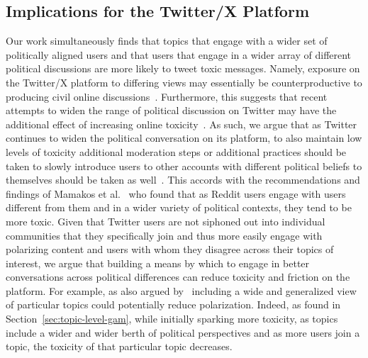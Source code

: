 \subsection{Implications for the Twitter/X Platform} Our work simultaneously finds that topics that engage with a wider set of politically aligned users and that users that engage in a wider array of different political discussions are more likely to tweet toxic messages. Namely, exposure on the Twitter/X platform to differing views may essentially be counterproductive to producing civil online discussions~\cite{bail2018exposure}.  Furthermore, this suggests that recent attempts to widen the range of political discussion on Twitter may have the additional effect of increasing online toxicity~\cite{hickey2023auditing}. As such, we argue that as Twitter continues to widen the political conversation on its platform, to also maintain low levels of toxicity additional moderation steps or additional practices should be taken to slowly introduce users to other accounts with different political beliefs to themselves should be taken as well~\cite{munson2010presenting}. This accords with the recommendations and findings of Mamakos et al.~\cite{mamakos2023social} who found that as Reddit users engage with users different from them and in a wider variety of political contexts, they tend to be more toxic. Given that Twitter users are not siphoned out into individual communities that they specifically join and thus more easily engage with polarizing content and users with whom they disagree across their topics of interest, we argue that building a means by which to engage in better conversations across political differences can reduce toxicity and friction on the platform. For example, as also argued by~\cite{nelimarkka2018social} including a wide and generalized view of particular topics could potentially reduce polarization. Indeed, as found in Section~\ref{sec:topic-level-gam}, while initially sparking more toxicity, as topics include a wider and wider berth of political perspectives and as more users join a topic, the toxicity of that particular topic decreases. 





